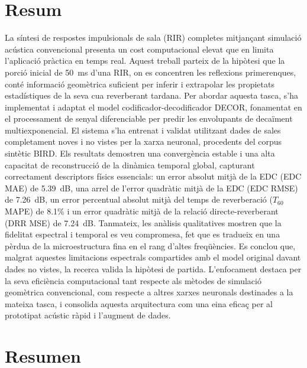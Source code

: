 
\chapter*{Resum}

La síntesi de respostes impulsionals de sala (RIR) completes mitjançant simulació acústica convencional presenta un cost computacional elevat que en limita l'aplicació pràctica en temps real. Aquest treball parteix de la hipòtesi que la porció inicial de 50~ms d'una RIR, on es concentren les reflexions primerenques, conté informació geomètrica suficient per inferir i extrapolar les propietats estadístiques de la seva cua reverberant tardana. Per abordar aquesta tasca, s'ha implementat i adaptat el model codificador-decodificador DECOR, fonamentat en el processament de senyal diferenciable per predir les envolupants de decaïment multiexponencial. El sistema s'ha entrenat i validat  utilitzant dades de sales completament noves i no vistes per la xarxa neuronal, procedents del corpus sintètic BIRD. Els resultats demostren una convergència estable i una alta capacitat de reconstrucció de la dinàmica temporal global, capturant correctament descriptors físics essencials: un error absolut mitjà de la EDC (EDC MAE) de 5.39~dB, una arrel de l'error quadràtic mitjà de la EDC (EDC RMSE) de 7.26~dB, un error percentual absolut mitjà del temps de reverberació ($T_{60}$ MAPE) de 8.1\% i un error quadràtic mitjà de la relació directe-reverberant (DRR MSE) de 7.24~dB. Tanmateix, les anàlisis qualitatives mostren que la fidelitat espectral i temporal es veu compromesa, fet que es tradueix en una pèrdua de la microestructura fina en el rang d'altes freqüències. Es conclou que, malgrat aquestes limitacions espectrals compartides amb el model original davant dades no vistes, la recerca valida la hipòtesi de partida. L'enfocament destaca per la seva eficiència computacional tant respecte als mètodes de simulació geomètrica convencional, com respecte a altres xarxes neuronals destinades a la mateixa tasca, i consolida aquesta arquitectura com una eina eficaç per al prototipat acústic ràpid i l'augment de dades.

\vfill %
\chapter*{Resumen}

